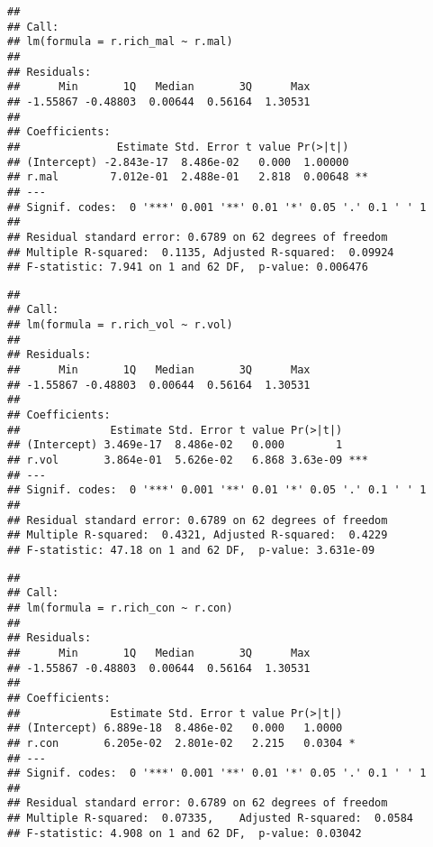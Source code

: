 \documentclass[]{article}
\newenvironment{Shaded}{\begin{snugshade}}{\end{snugshade}}
\newcommand{\KeywordTok}[1]{\textcolor[rgb]{0.13,0.29,0.53}{\textbf{#1}}}
\newcommand{\StringTok}[1]{\textcolor[rgb]{0.31,0.60,0.02}{#1}}
\newcommand{\CommentTok}[1]{\textcolor[rgb]{0.56,0.35,0.01}{\textit{#1}}}
\newcommand{\OperatorTok}[1]{\textcolor[rgb]{0.81,0.36,0.00}{\textbf{#1}}}
\newcommand{\NormalTok}[1]{#1}
\begin{document}
\begin{verbatim}
## 
## Call:
## lm(formula = r.rich_mal ~ r.mal)
## 
## Residuals:
##      Min       1Q   Median       3Q      Max 
## -1.55867 -0.48803  0.00644  0.56164  1.30531 
## 
## Coefficients:
##               Estimate Std. Error t value Pr(>|t|)   
## (Intercept) -2.843e-17  8.486e-02   0.000  1.00000   
## r.mal        7.012e-01  2.488e-01   2.818  0.00648 **
## ---
## Signif. codes:  0 '***' 0.001 '**' 0.01 '*' 0.05 '.' 0.1 ' ' 1
## 
## Residual standard error: 0.6789 on 62 degrees of freedom
## Multiple R-squared:  0.1135, Adjusted R-squared:  0.09924 
## F-statistic: 7.941 on 1 and 62 DF,  p-value: 0.006476
\end{verbatim}

\begin{Shaded}
\end{Shaded}

\begin{verbatim}
## 
## Call:
## lm(formula = r.rich_vol ~ r.vol)
## 
## Residuals:
##      Min       1Q   Median       3Q      Max 
## -1.55867 -0.48803  0.00644  0.56164  1.30531 
## 
## Coefficients:
##              Estimate Std. Error t value Pr(>|t|)    
## (Intercept) 3.469e-17  8.486e-02   0.000        1    
## r.vol       3.864e-01  5.626e-02   6.868 3.63e-09 ***
## ---
## Signif. codes:  0 '***' 0.001 '**' 0.01 '*' 0.05 '.' 0.1 ' ' 1
## 
## Residual standard error: 0.6789 on 62 degrees of freedom
## Multiple R-squared:  0.4321, Adjusted R-squared:  0.4229 
## F-statistic: 47.18 on 1 and 62 DF,  p-value: 3.631e-09
\end{verbatim}

\begin{Shaded}
\end{Shaded}

\begin{verbatim}
## 
## Call:
## lm(formula = r.rich_con ~ r.con)
## 
## Residuals:
##      Min       1Q   Median       3Q      Max 
## -1.55867 -0.48803  0.00644  0.56164  1.30531 
## 
## Coefficients:
##              Estimate Std. Error t value Pr(>|t|)  
## (Intercept) 6.889e-18  8.486e-02   0.000   1.0000  
## r.con       6.205e-02  2.801e-02   2.215   0.0304 *
## ---
## Signif. codes:  0 '***' 0.001 '**' 0.01 '*' 0.05 '.' 0.1 ' ' 1
## 
## Residual standard error: 0.6789 on 62 degrees of freedom
## Multiple R-squared:  0.07335,    Adjusted R-squared:  0.0584 
## F-statistic: 4.908 on 1 and 62 DF,  p-value: 0.03042
\end{verbatim}
\end{document}
